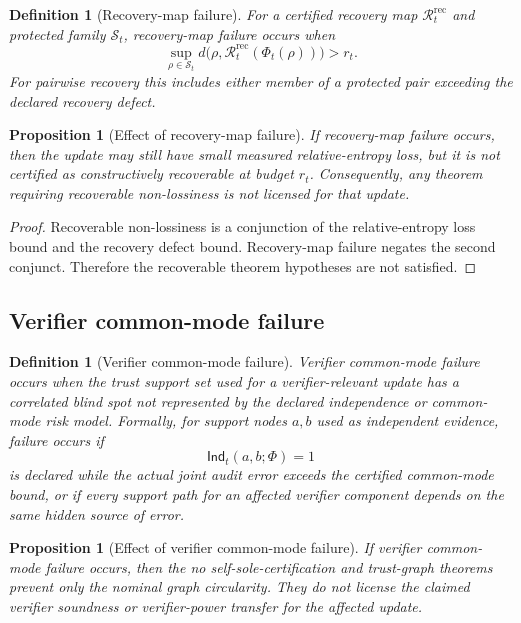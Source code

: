 \documentclass[11pt]{article}
\newtheorem{proposition}[theorem]{Proposition}
\newtheorem{definition}[theorem]{Definition}
\newcommand{\Rcal}{\mathcal{R}}
\newcommand{\1}{\mathbf{1}}
\providecommand{\Scal}{\mathcal{S}}
\begin{document}
\begin{definition}[Recovery-map failure]
For a certified recovery map \(\Rcal_t^{\mathrm{rec}}\) and protected family \(\Scal_t\), recovery-map failure occurs when
\[
\sup_{\rho\in\Scal_t}
 d\bigl(\rho,\Rcal_t^{\mathrm{rec}}(\Phi_t(\rho))\bigr)>r_t.
\]
For pairwise recovery this includes either member of a protected pair exceeding the declared recovery defect.
\end{definition}

\begin{proposition}[Effect of recovery-map failure]
If recovery-map failure occurs, then the update may still have small measured relative-entropy loss, but it is not certified as constructively recoverable at budget \(r_t\). Consequently, any theorem requiring recoverable non-lossiness is not licensed for that update.
\end{proposition}

\begin{proof}
Recoverable non-lossiness is a conjunction of the relative-entropy loss bound and the recovery defect bound. Recovery-map failure negates the second conjunct. Therefore the recoverable theorem hypotheses are not satisfied.
\end{proof}

\subsection{Verifier common-mode failure}

\begin{definition}[Verifier common-mode failure]
Verifier common-mode failure occurs when the trust support set used for a verifier-relevant update has a correlated blind spot not represented by the declared independence or common-mode risk model. Formally, for support nodes \(a,b\) used as independent evidence, failure occurs if
\[
\mathsf{Ind}_t(a,b;\Phi)=1
\]
is declared while the actual joint audit error exceeds the certified common-mode bound, or if every support path for an affected verifier component depends on the same hidden source of error.
\end{definition}

\begin{proposition}[Effect of verifier common-mode failure]
If verifier common-mode failure occurs, then the no self-sole-certification and trust-graph theorems prevent only the nominal graph circularity. They do not license the claimed verifier soundness or verifier-power transfer for the affected update.
\end{proposition}
\end{document}

